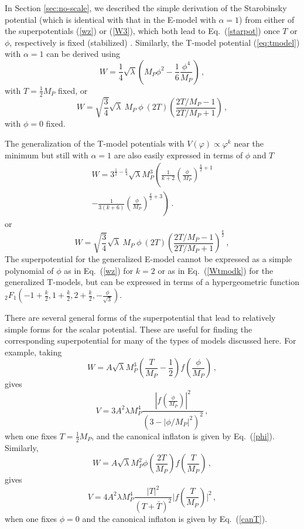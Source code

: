 \documentclass[aps,prev,twocolumn,preprintnumbers,floatfix,nofootinbib]{revtex4-1}
\newcommand{\beq}{\begin{equation}}
\newcommand{\eeq}{\end{equation}}
\begin{document}
In Section \ref{sec:no-scale}, we described the simple derivation of the Starobinsky potential (which is identical with that in the E-model with $\alpha = 1$) from either of the superpotentials (\ref{wz}) or (\ref{W3}), which both lead to Eq.~(\ref{starpot}) once $T$ or $\phi$, respectively  is fixed (stabilized) \cite{ENO6,ENO7}. Similarly, the T-model potential (\ref{eq:tmodel}) with $\alpha = 1$ can be derived using~\cite{GKMO}
\beq
W = \frac14\sqrt{\lambda} \left(M_P \phi^2 - \frac16 \frac{\phi^4}{M_P} \right) \, ,
\label{Wtmod}
\eeq
with $T = \frac{1}{2}M_P$ fixed, or 
\beq
W = \sqrt{\frac{3}{4}} \sqrt{\lambda}~M_P~\phi~(2T) \left( \frac{2T/M_P-1}{2T/M_P+1} \right)\, ,
\eeq
with $\phi = 0$ fixed. 

The generalization of the T-model potentials with  $V(\varphi) \propto \varphi^k$  near the minimum but still with $\alpha = 1$ are also easily expressed in terms of $\phi$ and $T$ 
\beq
\begin{aligned}
W = 3^{\frac12-\frac{k}{4}}\sqrt{\lambda} M_P^3\left(\frac{1}{k+2} \left(\frac{\phi}{M_P}\right)^{\frac{k}{2}+1} \right. \\
\left. - \frac{1}{3(k+6)} \left( \frac{\phi}{M_P}\right)^{\frac{k}{2}+ 3} \right) \, .
\label{Wtmodk}
\end{aligned}
\eeq
or 
\beq
W = \sqrt{\frac{3}{4}} \sqrt{\lambda}~M_P~\phi~(2T) \left( \frac{2T/M_P-1}{2T/M_P+1} \right)^{\frac{k}{2}} \, ,
\label{WTk}
\eeq
The superpotential for the generalized E-model cannot be  
expressed as a simple polynomial of $\phi$ as in Eq.~(\ref{wz}) for $k=2$ or as in Eq.~(\ref{Wtmodk}) for the generalized T-models, but can be expressed in terms of a hypergeometric function ${{}_2}F_1(-1 + \frac{k}{2}, 1 + \frac{k}{2}, 2 + \frac{k}{2}, -\frac{\phi}{\sqrt{3}})$.

There are several general forms of the superpotential that lead to relatively simple forms for the scalar potential.  These are useful for finding the corresponding superpotential for many of the types of models discussed here. For example, taking
\beq
W= A \sqrt{\lambda} M_P^3 \left(\frac{T}{M_P}-\frac12\right) f\left(\frac{\phi}{M_P} \right) \, ,
\label{Wfphi}
\eeq
gives 
\beq
V = 3 A^2 \lambda M_P^4 \frac{|f(\frac{\phi}{M_P})|^2}{(3-|\phi/M_P|^2)^2} \, ,
\eeq
when one fixes $T = \frac{1}{2} M_P$, and the canonical inflaton is given by Eq.~(\ref{phi}). 
Similarly, 
\beq
W= A \sqrt{\lambda} M_P^2 \phi \left(\frac{2T}{M_P}\right) f\left(\frac{T}{M_P}\right) \, ,
\label{simpT}
\eeq
gives 
\beq
V = 4 A^2 \lambda M_P^4 \frac{|T|^2}{(T+{\bar T})^2} \bigg|f\left(\frac{T}{M_P}\right) \bigg|^2 \, ,
\eeq
when one fixes $\phi = 0$ and the canonical inflaton is given by Eq.~(\ref{canT}). 
\end{document}
